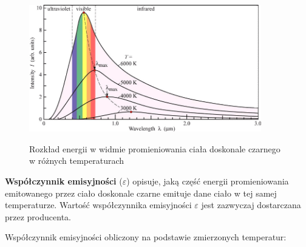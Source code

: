 \vspace{12pt}

\begin{figure}[h!]
    \centering
    \includegraphics[width=0.9\textwidth]{images/wave.png}
    \caption{Rozkład energii w widmie promieniowania ciała doskonale czarnego w różnych temperaturach} \cite{3}
    \label{fig:pomiar}
\end{figure}

\vspace{12pt}

\textbf{Współczynnik emisyjności} ($\varepsilon$) opisuje, jaką część energii promieniowania emitowanego przez ciało doskonale czarne emituje dane ciało w tej samej temperaturze. Wartość współczynnika emisyjności $\varepsilon$ jest zazwyczaj dostarczana przez producenta.

\vspace{12pt}

Współczynnik emisyjności obliczony na podstawie zmierzonych temperatur:


